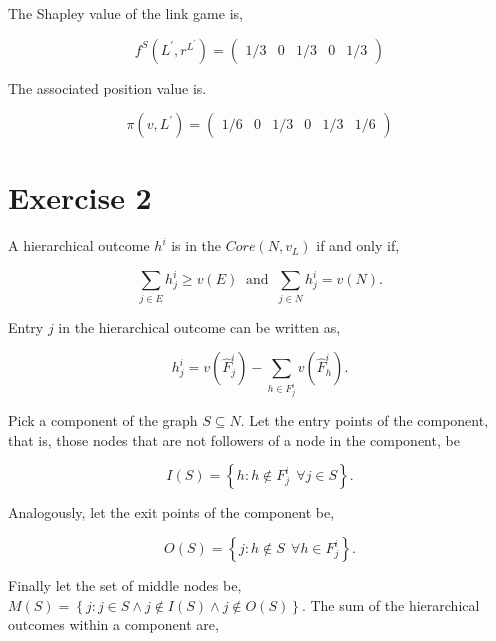 \documentclass[american]{scrartcl}
\newcommand{\set}[1]{\left\{#1\right\}}
\begin{document}
The Shapley value of the link game is,

\begin{equation}
    f^{S}(L^\prime, r^{L^\prime}) = \begin{pmatrix}
        1/3 &
        0   &
        1/3 &
        0   &
        1/3
    \end{pmatrix}
\end{equation}


The associated position value is.

\begin{equation}
    \pi(v, L^\prime) = \begin{pmatrix}
        1/6 &
        0   &
        1/3 &
        0   &
        1/3 &
        1/6
    \end{pmatrix}
\end{equation}

\section*{Exercise 2}

A hierarchical outcome $h^i$ is in the $Core(N, v_L)$ if and only if,

\begin{equation*}
    \sum_{j \in E} h^i_j \geq v(E) \ \text{  and  } \
    \sum_{j \in N} h^i_j = v(N).
\end{equation*}

Entry $j$ in the hierarchical outcome can be written as,

\begin{equation} \label{hier_def}
    h^i_{j} = v(\hat{F}^i_j) - \sum_{h \in F^i_j}  v(\hat{F}^i_h).
\end{equation}

Pick a component of the graph $S \subseteq N$. Let the entry points of the component, that is, those nodes that are not followers of a node in the component, be

\begin{equation}
    I(S) = \set{h: h \notin F_j^i \ \ \forall j \in S }.
\end{equation}

Analogously, let the exit points of the component be,

\begin{equation}
    O(S) = \set{j: h \notin S \ \ \forall h \in F_j^i }.
\end{equation}

Finally let the set of middle nodes be, $M(S) = \set{j: j \in S \land j \notin I(S)\land j \notin O(S)}$. The sum of the hierarchical outcomes within a component are,
\end{document}
